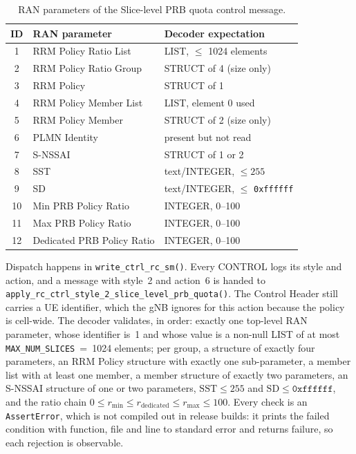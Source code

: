 \begin{table}[t]
\centering
\caption{RAN parameters of the Slice-level PRB quota control message.}
\label{tab:oai-ranparam}
\scriptsize
\begin{tabular}{@{}cll@{}}
\toprule
ID & RAN parameter & Decoder expectation \\
\midrule
1 & RRM Policy Ratio List & LIST, $\leq$ 1024 elements \\
2 & RRM Policy Ratio Group & STRUCT of 4 (size only) \\
3 & RRM Policy & STRUCT of 1 \\
4 & RRM Policy Member List & LIST, element 0 used \\
5 & RRM Policy Member & STRUCT of 2 (size only) \\
6 & PLMN Identity & present but not read \\
7 & S-NSSAI & STRUCT of 1 or 2 \\
8 & SST & text/INTEGER, $\leq 255$ \\
9 & SD & text/INTEGER, $\leq$ \texttt{0xffffff} \\
10 & Min PRB Policy Ratio & INTEGER, 0--100 \\
11 & Max PRB Policy Ratio & INTEGER, 0--100 \\
12 & Dedicated PRB Policy Ratio & INTEGER, 0--100 \\
\bottomrule
\end{tabular}
\end{table}

Dispatch happens in \texttt{write\_ctrl\_rc\_sm()}. Every CONTROL logs its style and action, and a message with style~2 and action~6 is handed to \texttt{apply\_rc\_ctrl\_style\_2\_slice\_level\_prb\_quota()}. The Control Header still carries a UE identifier, which the gNB ignores for this action because the policy is cell-wide. The decoder validates, in order: exactly one top-level RAN parameter, whose identifier is~1 and whose value is a non-null LIST of at most \texttt{MAX\_NUM\_SLICES}~=~1024 elements; per group, a structure of exactly four parameters, an RRM Policy structure with exactly one sub-parameter, a member list with at least one member, a member structure of exactly two parameters, an S-NSSAI structure of one or two parameters, $\mathrm{SST}\leq255$ and $\mathrm{SD}\leq\texttt{0xffffff}$, and the ratio chain $0\leq r_{\min}\leq r_{\mathrm{dedicated}}\leq r_{\max}\leq100$. Every check is an \texttt{AssertError}, which is not compiled out in release builds: it prints the failed condition with function, file and line to standard error and returns failure, so each rejection is observable.

